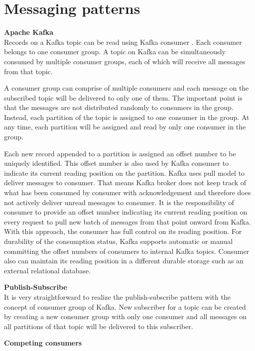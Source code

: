 \section{Messaging patterns} \label{section:patterns}
\large \textbf{Apache Kafka}\\
\normalsize
Records on a Kafka topic can be read using Kafka consumer \cite{kafkadesignconsumer}.  Each consumer belongs to one consumer group. A topic on Kafka can be simultaneously consumed by multiple consumer groups, each of which will receive all messages from that topic. 
 
A consumer group can comprise of multiple consumers and each message on the subscribed topic will be delivered to only one of them. The important point is that the messages are not distributed randomly to consumers in the group. Instead, each partition of the topic is assigned to one consumer in the group. At any time, each partition will be assigned and read by only one consumer in the group. 

Each new record appended to a partition is assigned an offset number to be uniquely identified. This offset number is also used by Kafka consumer to indicate its current reading position on the partition. Kafka uses pull model to deliver messages to consumer. That means Kafka broker does not keep track of what has been consumed by consumer with acknowledgement and therefore does not actively deliver unread messages to consumer.  It is the responsibility of consumer to provide an offset number indicating its current reading position on every request to pull new batch of messages from that point onward from Kafka. With this approach, the consumer has full control on its reading position. For durability of the consumption status, Kafka supports automatic or manual committing the offset numbers of consumers to internal Kafka topics. Consumer also can maintain its reading position in a different durable storage such as an external relational database.

\textbf{Publish-Subscribe}\\
It is very straightforward to realize the publish-subscribe pattern with the concept of consumer group of Kafka. New subscriber for a topic can be created by creating a new consumer group with only one consumer and all messages on all partitions of that topic will be delivered to this subscriber.

\textbf{Competing consumers}\\

